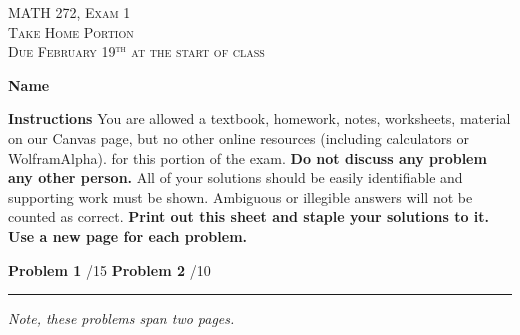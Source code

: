 \documentclass[12pt]{amsbook}
\begin{document}

\begin{center}
   \textsc{\large MATH 272, Exam 1}\\
   \textsc{Take Home Portion}\\
   \textsc{Due February 19$^\textrm{th}$ at the start of class}
\end{center}
\vspace{1cm}

\noindent\textbf{Name} \; \underline{\hspace{8cm}}

\vspace{1cm}

\noindent\textbf{Instructions} \; You are allowed a textbook, homework, notes, worksheets, material on our Canvas page, but no other online resources (including calculators or WolframAlpha). for this portion of the exam.  \textbf{Do not discuss any problem any other person.} All of your solutions should be easily identifiable and supporting work must be shown.  Ambiguous or illegible answers will not be counted as correct. \textbf{Print out this sheet and staple your solutions to it. Use a new page for each problem.}


\vspace{1cm}

\begin{center}\textbf{Problem 1} \; \underline{\hspace{1cm}}/15 \qquad \qquad \textbf{Problem 2} \; \underline{\hspace{1cm}}/10\end{center}

\vspace{1cm}

\hrule

\vspace*{1cm}
\noindent\emph{Note, these problems span two pages.}\\
\end{document}
